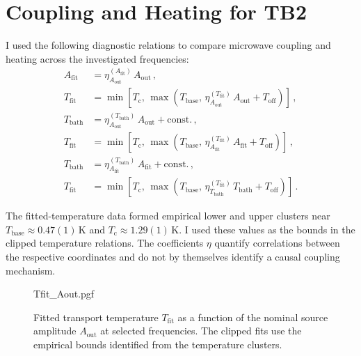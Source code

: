 \chapter{Coupling and Heating for TB2}
\label{appendix:coupling-and-heating}

    I used the following diagnostic relations to compare microwave coupling and heating across the investigated frequencies:
    \begin{align}
        A_\mathrm{fit} &= \eta_{A_\mathrm{out}}^{(A_\mathrm{fit})}\, A_\mathrm{out}\,,\\
        T_\mathrm{fit} &= \min\!\left[T_\mathrm{c},\,\max\!\left(T_\mathrm{base},\,\eta_{A_\mathrm{out}}^{(T_\mathrm{fit})}\, A_\mathrm{out}+T_\mathrm{off}\right)\right]\,,\\
        T_\mathrm{bath} &= \eta_{A_\mathrm{out}}^{(T_\mathrm{bath})}\, A_\mathrm{out}+ \mathrm{const.}\,,\\
        T_\mathrm{fit} &= \min\!\left[T_\mathrm{c},\,\max\!\left(T_\mathrm{base},\,\eta_{A_\mathrm{fit}}^{(T_\mathrm{fit})}\, A_\mathrm{fit}+T_\mathrm{off}\right)\right]\,,\\
        T_\mathrm{bath} &= \eta_{A_\mathrm{fit}}^{(T_\mathrm{bath})}\, A_\mathrm{fit}+ \mathrm{const.}\,,\\
        T_\mathrm{fit} &= \min\!\left[T_\mathrm{c},\,\max\!\left(T_\mathrm{base},\,\eta_{T_\mathrm{bath}}^{(T_\mathrm{fit})}\, T_\mathrm{bath}+T_\mathrm{off}\right)\right]\,.
        \label{eq:tb:asym:diagnostic-couplings}
    \end{align}

    The fitted-temperature data formed empirical lower and upper clusters near $T_\mathrm{base}\approx0.47(1)\,\mathrm{K}$ and $T_\mathrm{c}\approx1.29(1)\,\mathrm{K}$. I used these values as the bounds in the clipped temperature relations. The coefficients $\eta$ quantify correlations between the respective coordinates and do not by themselves identify a causal coupling mechanism.

    \begin{figure}[t]
        \centering
        {Tfit_Aout.pgf}
        \caption{
            Fitted transport temperature $T_\mathrm{fit}$ as a function of the nominal source amplitude $A_\mathrm{out}$ at selected frequencies. The clipped fits use the empirical bounds identified from the temperature clusters.
        }
        \label{fig:tb:asym:control-Tfit_Aout}
    \end{figure}

